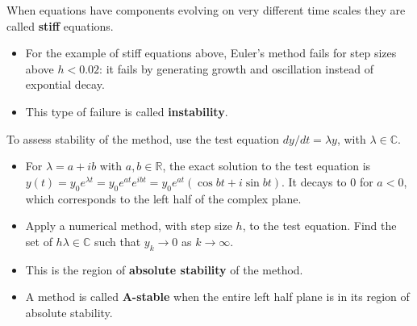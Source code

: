 \documentclass[12pt,letterpaper,noanswers]{exam}
\begin{document}
\begin{tcolorbox}
When equations have components evolving on very different time scales they are called \textbf{stiff} equations.
\begin{itemize}
\itemsep0pt
    \item For the example of stiff equations above, Euler's method fails for step sizes above $h<0.02$: it fails by generating growth and oscillation instead of expontial decay.
    \item This type of failure is called \textbf{instability}.
\end{itemize}
\end{tcolorbox}
\begin{tcolorbox}
To assess stability of the method, use the test equation $dy/dt = \lambda y$, with $\lambda \in \mathbb{C}$.
\begin{itemize}
\itemsep0pt
\item For $\lambda = a + ib$ with $a,b\in\mathbb{R}$, the exact solution to the test equation is $y(t) = y_0e^{\lambda t} = y_0e^{at}e^{ibt} = y_0e^{at}(\cos bt + i \sin bt)$.  It decays to $0$ for $a<0$, which corresponds to the left half of the complex plane.
    \item Apply a numerical method, with step size $h$, to the test equation.  Find the set of $h\lambda \in \mathbb{C}$ such that $y_k\rightarrow 0$ as $k\rightarrow\infty$.
    \item This is the region of \textbf{absolute stability} of the method.
    \item A method is called \textbf{A-stable} when the entire left half plane is in its region of absolute stability.
\end{itemize}
\end{tcolorbox}
\end{document}
